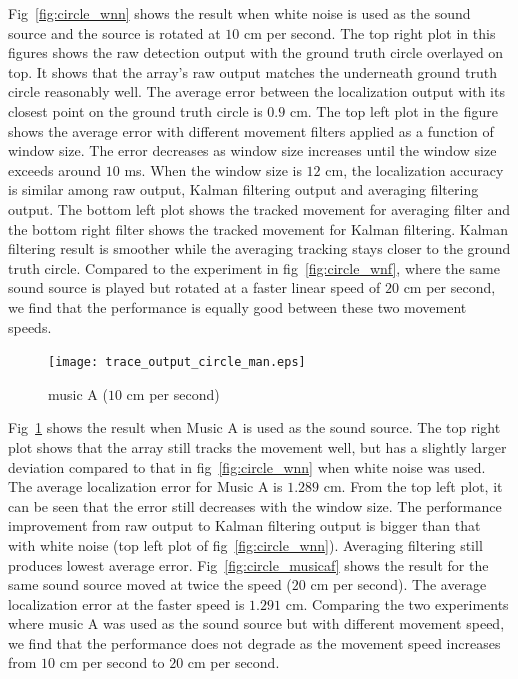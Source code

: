 Fig~\ref{fig:circle_wnn} shows the result when white noise is used as the sound source and the source is rotated at $10$ cm per second. The top right plot in this figures shows the raw detection output with the ground truth circle overlayed on top. It shows that the array's raw output matches the underneath ground truth circle reasonably well. The average error between the localization output with its closest point on the ground truth circle is $0.9$ cm. The top left plot in the figure shows the average error with different movement filters applied as a function of window size. The error decreases as window size increases until the window size exceeds around $10$ ms. When the window size is $12$ cm, the localization accuracy is similar among raw output, Kalman filtering output and averaging filtering output. The bottom left plot shows the tracked movement for averaging filter and the bottom right filter shows the tracked movement for Kalman filtering. Kalman filtering result is smoother while the averaging tracking stays closer to the ground truth circle. Compared to the experiment in fig~\ref{fig:circle_wnf}, where the same sound source is played but rotated at a faster linear speed of $20$ cm per second, we find that the performance is equally good between these two movement speeds.

\begin{figure}[h!]
\centering
\texttt{[image: trace\_output\_circle\_man.eps]}
\caption{music A ($10$ cm per second)}
\label{fig:circle_musican}
\end{figure}

Fig~\ref{fig:circle_musican} shows the result when Music A is used as the sound source.  The top right plot shows that the array still tracks the movement well, but has a slightly larger deviation compared to that in fig~\ref{fig:circle_wnn} when white noise was used. The average localization error for Music A is $1.289$ cm. From the top left plot, it can be seen that the error still decreases with the window size. The performance improvement from raw output to Kalman filtering output is bigger than that with white noise (top left plot of fig~\ref{fig:circle_wnn}). Averaging filtering still produces lowest average error. Fig~\ref{fig:circle_musicaf} shows the result for the same sound source moved at twice the speed ($20$ cm per second). The average localization error at the faster speed is $1.291$ cm. Comparing the two experiments where music A was used as the sound source but with different movement speed, we find that the performance does not degrade as the movement speed increases from $10$ cm per second to $20$ cm per second. 

